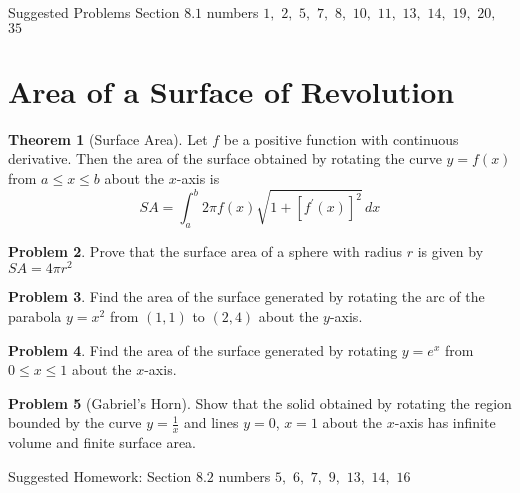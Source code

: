 \documentclass[letterpaper, twoside, 12pt]{book}
\theoremstyle{definition}
\newtheorem{theorem}{Theorem}
\theoremstyle{definition}
\newtheorem{problem}[theorem]{Problem}
\begin{document}
\vfill

\noindent Suggested Problems Section $8.1$ numbers $1,$ $2,$ $5,$ $7,$ $8,$ $10,$ $11,$ $13,$ $14,$ $19,$ $20,$ $35$

\newpage

\section{Area of a Surface of Revolution}

\begin{theorem}[Surface Area]
  Let $f$ be a positive function with continuous derivative.
  Then the area of the surface obtained by rotating the
  curve $y = f(x)$ from $a \leq x \leq b$ about the $x$-axis is
  \[
    SA
      =
    \int_a^b 2\pi f(x) \sqrt{1+\left[f^\prime\left(x\right)\right]^2} \, dx
  \]
\end{theorem}

\begin{problem}
  Prove that the surface area of a sphere with radius $r$ is given by
  $SA=4\pi r^2$
\end{problem}

\vfill

\begin{problem}
  Find the area of the surface generated by rotating the arc of the parabola
  $y = x^2$ from $(1,1)$ to $(2,4)$ about the $y$-axis.
\end{problem}

\vfill

\newpage

\begin{problem}
 Find the area of the surface generated by rotating $y=e^x$
 from $0 \leq x \leq 1$ about the $x$-axis.
\end{problem}

\vfill

\begin{problem}[Gabriel's Horn]
  Show that the solid obtained by rotating the region
  bounded by the curve $y=\frac{1}{x}$ and lines $y=0$, $x=1$ about the
  $x$-axis has infinite volume and finite surface area.
\end{problem}

\vfill

\noindent Suggested Homework: Section $8.2$ numbers $5,$ $6,$ $7,$ $9,$ $13,$ $14,$ $16$
\end{document}
